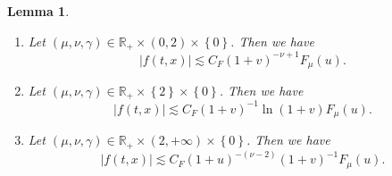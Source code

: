 \documentclass[a4paper,reqno]{amsart}
\newtheorem{lemma}[theorem]{Lemma}
\theoremstyle{definition}
\numberwithin{equation}{section}
\def \R {{\mathbb{R} }}
\begin{document}
\begin{lemma}
\begin{enumerate}
\begin{enumerate}
		\item [\emph{(b)}]
        Let $(\mu,\nu,\gamma)\in \R_{+}\times (0,2)\times\left\{0\right\}$.
        Then we have 
		\begin{equation*}
		|f(t,x)|\lesssim C_{F}(1+v)^{-\nu+1}F_{\mu}(u).
		\end{equation*}
		
		\item [\emph{(c)}] 
        Let $(\mu,\nu,\gamma)\in \R_{+}\times \left\{2\right\}\times \left\{0\right\}$.
        Then we have 
		\begin{equation*}
		|f(t,x)|\lesssim C_{F}(1+v)^{-1}\ln (1+v)F_{\mu}(u).
		\end{equation*}
		
		\item [\emph{(d)}]
        Let $(\mu,\nu,\gamma)\in \mathbb{R}_{+}\times (2,+\infty)\times \left\{0\right\}$.
        Then we have 
		\begin{equation*}
		|f(t,x)|\lesssim C_{F}(1+u)^{-(\nu-2)}(1+v)^{-1}F_{\mu}(u).
		\end{equation*}
\end{enumerate}
 
 \end{enumerate}
 \end{lemma}
\end{document}
